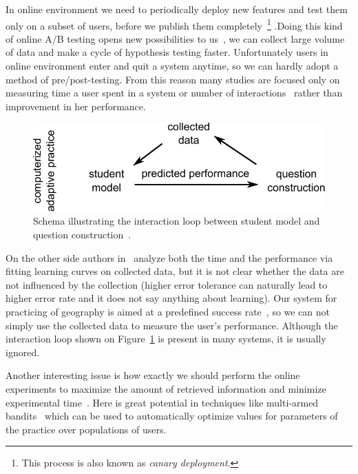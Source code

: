 \documentclass[table,color]{fithesis3/fithesis3}
\begin{document}
In online environment we need to periodically deploy new features and
test them only on a subset of users, before we publish them
completely~\footnote{This process is also known as \emph{canary deployment}.}
.Doing this kind of online A/B testing opens new possibilities to
us~\cite{stamper2012rise}, we can collect large volume of data and make a
cycle of hypothesis testing faster. Unfortunately users in online environment
enter and quit a system anytime, so we can hardly adopt a method of
pre/post-testing. From this reason many studies are focused only on measuring
time a user spent in a system or number of
interactions~\cite{papousek2015impact,monterrat2015player}
rather than improvement in her performance.

\begin{figure}[h]
	\begin{center}
		\includegraphics[width=.7\textwidth]{figure/interaction_loop}
	\end{center}
	\caption{Schema illustrating the interaction loop between student model and
		question construction~\cite{niznan2015exploring}.}
	\label{figure:interaction_loop}
\end{figure}

On the other side authors in~\cite{lomas2013optimizing} analyze both the time
and the performance via fitting learning curves on collected data, but it is
not clear whether the data are not influenced by the collection (higher error
tolerance can naturally lead to higher error rate and it does not say anything
about learning).  Our system for practicing of geography is aimed at a
predefined success rate~\cite{papousek2014adaptive}, so we can not simply use
the collected data to measure the user's performance. Although the interaction loop
shown on Figure~\ref{figure:interaction_loop} is present in many systems, it is
usually ignored.

Another interesting issue is how exactly we should perform the online
experiments to maximize the amount of retrieved information and minimize
experimental time~\cite{liu2014towards}. Here is great potential in techniques
like multi-armed bandits~\cite{liu2014trading} which can be used to
automatically optimize values for parameters of the practice over populations
of users.
\end{document}
